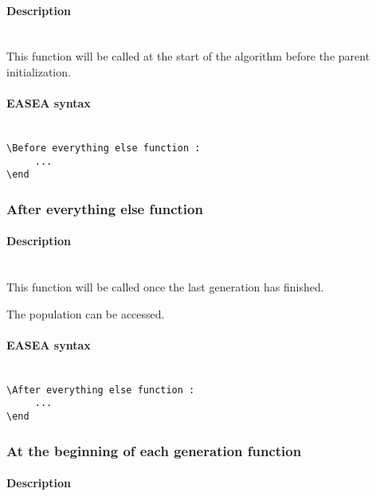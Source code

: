 \documentclass{book}
\begin{document}
\paragraph{Description}\label{description-4}
~\\

This function will be called at the start of the algorithm before the
parent initialization.

\paragraph{EASEA syntax}\label{easea-syntax-4}
~\\

\texttt{\textbackslash{}Before~everything~else~function~:}\\\texttt{~~~~~...}\\\texttt{\textbackslash{}end}

\subsubsection{After everything else
function}\label{after-everything-else-function}

\paragraph{Description}\label{description-5}
~\\

This function will be called once the last generation has finished.

The population can be accessed.

\paragraph{EASEA syntax}\label{easea-syntax-5}
~\\

\texttt{\textbackslash{}After~everything~else~function~:}\\\texttt{~~~~~...}\\\texttt{\textbackslash{}end}

\subsubsection{At the beginning of each generation
function}\label{at-the-beginning-of-each-generation-function}

\paragraph{Description}\label{description-6}
~\\
\end{document}
